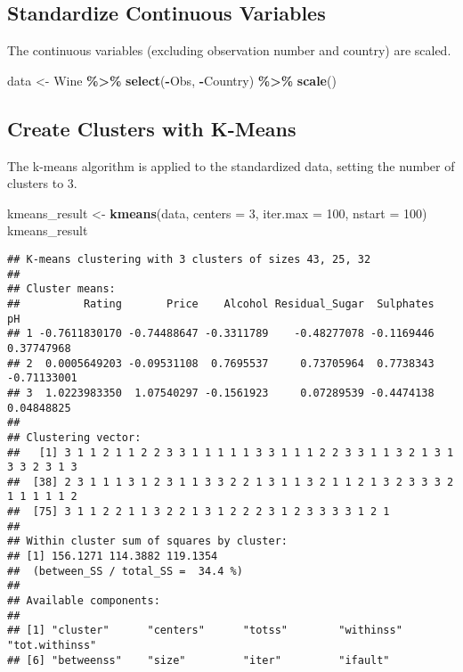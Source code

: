 \documentclass[
]{article}
\newenvironment{Shaded}{\begin{snugshade}}{\end{snugshade}}
\newcommand{\AttributeTok}[1]{\textcolor[rgb]{0.13,0.29,0.53}{#1}}
\newcommand{\DecValTok}[1]{\textcolor[rgb]{0.00,0.00,0.81}{#1}}
\newcommand{\FunctionTok}[1]{\textcolor[rgb]{0.13,0.29,0.53}{\textbf{#1}}}
\newcommand{\NormalTok}[1]{#1}
\newcommand{\OtherTok}[1]{\textcolor[rgb]{0.56,0.35,0.01}{#1}}
\newcommand{\SpecialCharTok}[1]{\textcolor[rgb]{0.81,0.36,0.00}{\textbf{#1}}}
\begin{document}
\subsection{Standardize Continuous
Variables}\label{standardize-continuous-variables}

The continuous variables (excluding observation number and country) are
scaled.

\begin{Shaded}
\begin{Highlighting}[]
\NormalTok{data }\OtherTok{\textless{}{-}}\NormalTok{ Wine }\SpecialCharTok{\%\textgreater{}\%} \FunctionTok{select}\NormalTok{(}\SpecialCharTok{{-}}\NormalTok{Obs, }\SpecialCharTok{{-}}\NormalTok{Country) }\SpecialCharTok{\%\textgreater{}\%} \FunctionTok{scale}\NormalTok{()}
\end{Highlighting}
\end{Shaded}

\subsection{Create Clusters with
K-Means}\label{create-clusters-with-k-means}

The k-means algorithm is applied to the standardized data, setting the
number of clusters to 3.

\begin{Shaded}
\begin{Highlighting}[]
\NormalTok{kmeans\_result }\OtherTok{\textless{}{-}} \FunctionTok{kmeans}\NormalTok{(data, }\AttributeTok{centers =} \DecValTok{3}\NormalTok{, }\AttributeTok{iter.max =} \DecValTok{100}\NormalTok{, }\AttributeTok{nstart =} \DecValTok{100}\NormalTok{)}
\NormalTok{kmeans\_result}
\end{Highlighting}
\end{Shaded}

\begin{verbatim}
## K-means clustering with 3 clusters of sizes 43, 25, 32
## 
## Cluster means:
##          Rating       Price    Alcohol Residual_Sugar  Sulphates          pH
## 1 -0.7611830170 -0.74488647 -0.3311789    -0.48277078 -0.1169446  0.37747968
## 2  0.0005649203 -0.09531108  0.7695537     0.73705964  0.7738343 -0.71133001
## 3  1.0223983350  1.07540297 -0.1561923     0.07289539 -0.4474138  0.04848825
## 
## Clustering vector:
##   [1] 3 1 1 2 1 1 2 2 3 3 1 1 1 1 1 3 3 1 1 1 2 2 3 3 1 1 3 2 1 3 1 3 3 2 3 1 3
##  [38] 2 3 1 1 1 3 1 2 3 1 1 3 3 2 2 1 3 1 1 3 2 1 1 2 1 3 2 3 3 3 2 1 1 1 1 1 2
##  [75] 3 1 1 2 2 1 1 3 2 2 1 3 1 2 2 2 3 1 2 3 3 3 3 1 2 1
## 
## Within cluster sum of squares by cluster:
## [1] 156.1271 114.3882 119.1354
##  (between_SS / total_SS =  34.4 %)
## 
## Available components:
## 
## [1] "cluster"      "centers"      "totss"        "withinss"     "tot.withinss"
## [6] "betweenss"    "size"         "iter"         "ifault"
\end{verbatim}
\end{document}
